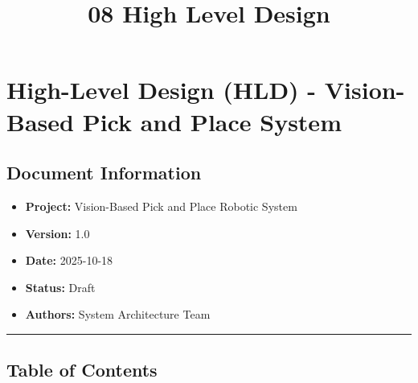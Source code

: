 \documentclass[
]{article}
\title{08 High Level Design}
\author{}
\date{}
\providecommand{\tightlist}{%
  \setlength{\itemsep}{0pt}\setlength{\parskip}{0pt}}
\begin{document}
\maketitle

{
\setcounter{tocdepth}{3}
\tableofcontents
}
\hypertarget{high-level-design-hld---vision-based-pick-and-place-system}{%
\section{High-Level Design (HLD) - Vision-Based Pick and Place
System}\label{high-level-design-hld---vision-based-pick-and-place-system}}

\hypertarget{document-information}{%
\subsection{Document Information}\label{document-information}}

\begin{itemize}
\tightlist
\item
  \textbf{Project:} Vision-Based Pick and Place Robotic System
\item
  \textbf{Version:} 1.0
\item
  \textbf{Date:} 2025-10-18
\item
  \textbf{Status:} Draft
\item
  \textbf{Authors:} System Architecture Team
\end{itemize}

\begin{center}\rule{0.5\linewidth}{0.5pt}\end{center}

\hypertarget{table-of-contents}{%
\subsection{Table of Contents}\label{table-of-contents}}
\end{document}
